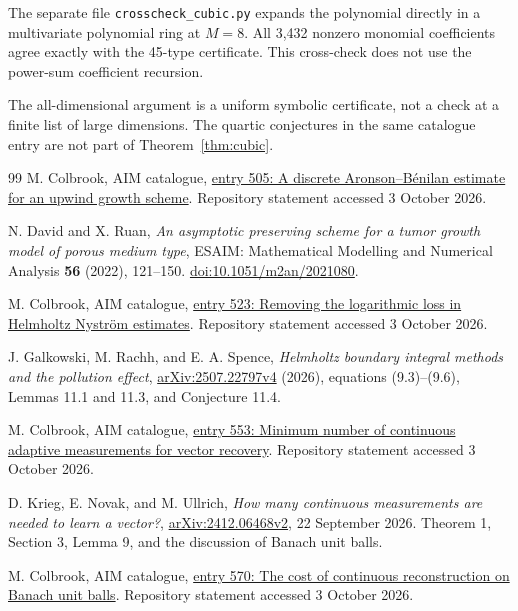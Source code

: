 \documentclass[11pt,a4paper]{article}
\theoremstyle{remark}
\begin{document}
The separate file \texttt{crosscheck\_cubic.py} expands the polynomial directly in a multivariate polynomial ring at $M=8$. All 3,432 nonzero monomial coefficients agree exactly with the 45-type certificate. This cross-check does not use the power-sum coefficient recursion.

The all-dimensional argument is a uniform symbolic certificate, not a check at a finite list of large dimensions. The quartic conjectures in the same catalogue entry are not part of Theorem~\ref{thm:cubic}.

\newpage
\begin{thebibliography}{99}
M. Colbrook, AIM catalogue, \href{https://github.com/MColbrook/AIM/blob/main/problems/505-upwind-discrete-aronson-benilan.md}{entry 505: A discrete Aronson--B\'enilan estimate for an upwind growth scheme}. Repository statement accessed 3 October 2026.

N. David and X. Ruan, \emph{An asymptotic preserving scheme for a tumor growth model of porous medium type}, ESAIM: Mathematical Modelling and Numerical Analysis \textbf{56} (2022), 121--150. \href{https://doi.org/10.1051/m2an/2021080}{doi:10.1051/m2an/2021080}.

M. Colbrook, AIM catalogue, \href{https://github.com/MColbrook/AIM/blob/main/problems/523-nystrom-logarithmic-loss.md}{entry 523: Removing the logarithmic loss in Helmholtz Nystr\"om estimates}. Repository statement accessed 3 October 2026.

J. Galkowski, M. Rachh, and E. A. Spence, \emph{Helmholtz boundary integral methods and the pollution effect}, \href{https://arxiv.org/abs/2507.22797v4}{arXiv:2507.22797v4} (2026), equations (9.3)--(9.6), Lemmas 11.1 and 11.3, and Conjecture 11.4.

M. Colbrook, AIM catalogue, \href{https://github.com/MColbrook/AIM/blob/main/problems/553-continuous-adaptive-measurement-complexity.md}{entry 553: Minimum number of continuous adaptive measurements for vector recovery}. Repository statement accessed 3 October 2026.

D. Krieg, E. Novak, and M. Ullrich, \emph{How many continuous measurements are needed to learn a vector?}, \href{https://arxiv.org/abs/2412.06468v2}{arXiv:2412.06468v2}, 22 September 2026. Theorem 1, Section 3, Lemma 9, and the discussion of Banach unit balls.

M. Colbrook, AIM catalogue, \href{https://github.com/MColbrook/AIM/blob/main/problems/570-continuous-decoder-banach-balls.md}{entry 570: The cost of continuous reconstruction on Banach unit balls}. Repository statement accessed 3 October 2026.


\end{thebibliography}
\end{document}
